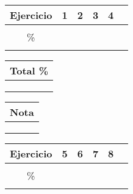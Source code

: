 	\begin{tabular}{|c|c|c|c|cc|}
		\hline
		Ejercicio & \hspace{0.5cm} 1\hspace{0.5cm}  &\hspace{0.5cm}  2\hspace{0.5cm} & \hspace{0.5cm} 3\hspace{0.5cm} & \hspace{0.5cm} 4\hspace{0.5cm}&\\ \hline
		&  & & & &\\
		\% & &  & & & \\
		&  & & & &\\ \hline
	\end{tabular}
	\hspace*{0.5cm}
	\begin{tabular}{|c|}
		\hline
		\hspace{0.0cm} {\bf Total \%}\hspace{0.0cm}   \\ \hline
		\\
		\\
		\\ \hline
	\end{tabular}
	\hspace*{0.5cm}
	\begin{tabular}{|c|}
		\hline
		\hspace{0.3cm} {\bf Nota}\hspace{0.3cm}   \\ \hline
		\\
		\\
		\\ \hline
	\end{tabular}
	
		\begin{tabular}{|c|c|c|c|cc|}
		\hline
		Ejercicio & \hspace{0.5cm} 5\hspace{0.5cm}  &\hspace{0.5cm}  6\hspace{0.5cm} & \hspace{0.5cm} 7\hspace{0.5cm} & \hspace{0.5cm} 8\hspace{0.5cm}&\\ \hline
		&  & & & &\\
		\% & &  & & & \\
		&  & & & &\\ \hline
	\end{tabular}
	


